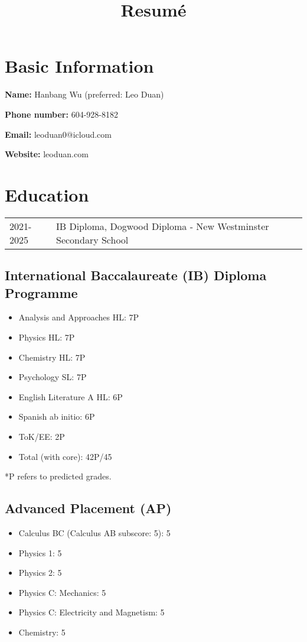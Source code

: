 \documentclass{article}
\title{\textbf{Resumé}}
\author{}
\date{}
\begin{document}
\maketitle

\section*{Basic Information}

\textbf{Name:} Hanbang Wu (preferred: Leo Duan)

\textbf{Phone number:} 604-928-8182

\textbf{Email:} leoduan0@icloud.com

\textbf{Website:} leoduan.com

\section*{Education}

\begin{tabular}{@{}ll}
	2021-2025 & IB Diploma, Dogwood Diploma - New Westminster Secondary School \\
\end{tabular}

\subsection*{International Baccalaureate (IB) Diploma Programme}

\begin{itemize}
	\item Analysis and Approaches HL: 7P
	\item Physics HL: 7P
	\item Chemistry HL: 7P
	\item Psychology SL: 7P
	\item English Literature A HL: 6P
	\item Spanish ab initio: 6P
	\item ToK/EE: 2P
	\item Total (with core): 42P/45
\end{itemize}

*P refers to predicted grades.

\subsection*{Advanced Placement (AP)}

\begin{itemize}
	\item Calculus BC (Calculus AB subscore: 5): 5
	\item Physics 1: 5
	\item Physics 2: 5
	\item Physics C: Mechanics: 5
	\item Physics C: Electricity and Magnetism: 5
	\item Chemistry: 5
\end{itemize}
\end{document}
